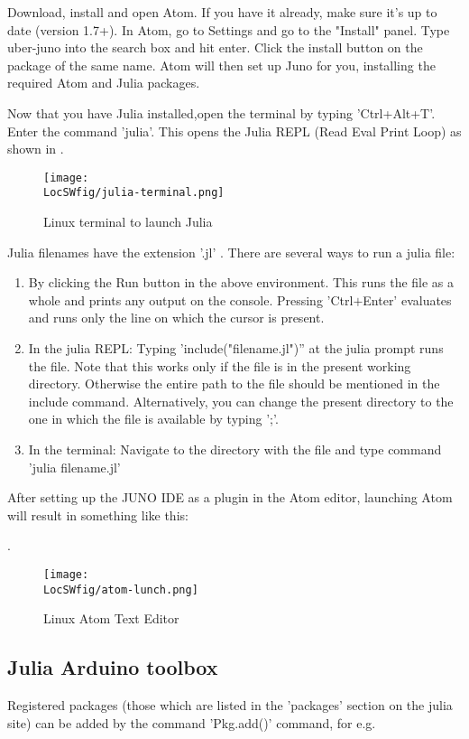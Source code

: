 Download, install and open Atom. If you have it already, make sure it's up to date (version 1.7+).
In Atom, go to Settings and go to the "Install" panel.
Type uber-juno into the search box and hit enter. Click the install button on the package of the same name.
Atom will then set up Juno for you, installing the required Atom and Julia packages.

Now that you have Julia installed,open the terminal by typing 'Ctrl+Alt+T'.
Enter the command 'julia'. This opens the Julia REPL (Read Eval Print Loop)
as shown in
.
\begin{figure}
      \centering
      \texttt{[image: \\LocSWfig/julia-terminal.png]}
      \caption{Linux terminal to launch Julia}
      \label{julia-terminal}
\end{figure}

Julia filenames have the extension '.jl' . There are several ways to run a julia file:

\begin{enumerate}
      \item By clicking the Run button in the above environment. This runs the file as a whole and prints any output on the console. Pressing 'Ctrl$+$Enter' evaluates and runs only the line on which the cursor is present.
      \item In the julia REPL: Typing 'include("filename.jl")'' at the julia prompt runs the file. Note that this works only if the file is in the present working directory. Otherwise the entire path to the file should be mentioned in the include command. Alternatively, you can change the present directory to the one in which the file is available by typing ';'.
      \item In the terminal: Navigate to the directory with the file and type command 'julia filename.jl'
\end{enumerate}


After setting up the JUNO IDE as a plugin in the Atom editor, launching Atom will result in something like this:

.
\begin{figure}
      \centering
      \texttt{[image: \\LocSWfig/atom-lunch.png]}
      \caption{Linux Atom Text Editor}
      \label{atom-lunch}
\end{figure}

\subsection{Julia Arduino toolbox}
Registered packages (those which are listed in the 'packages' section on the julia site) can be added by the command 'Pkg.add()' command, for e.g.

